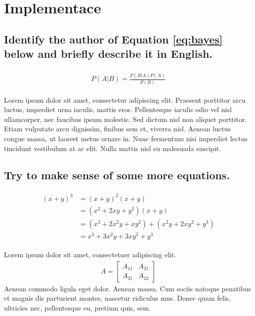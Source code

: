 \documentclass[11pt]{scrartcl} %
\begin{document}
\section{Implementace}

\subsection{Identify the author of Equation \ref{eq:bayes} below and briefly describe it in English.}

\begin{align} 
	\label{eq:bayes}
	\begin{split}
		P(A|B) = \frac{P(B|A)P(A)}{P(B)}
	\end{split}					
\end{align}

Lorem ipsum dolor sit amet, consectetur adipiscing elit. Praesent porttitor arcu luctus, imperdiet urna iaculis, mattis eros. Pellentesque iaculis odio vel nisl ullamcorper, nec faucibus ipsum molestie. Sed dictum nisl non aliquet porttitor. Etiam vulputate arcu dignissim, finibus sem et, viverra nisl. Aenean luctus congue massa, ut laoreet metus ornare in. Nunc fermentum nisi imperdiet lectus tincidunt vestibulum at ac elit. Nulla mattis nisl eu malesuada suscipit.


\subsection{Try to make sense of some more equations.}

\begin{align} 
	\begin{split}
		(x+y)^3 &= (x+y)^2(x+y)\\
		&=(x^2+2xy+y^2)(x+y)\\
		&=(x^3+2x^2y+xy^2) + (x^2y+2xy^2+y^3)\\
		&=x^3+3x^2y+3xy^2+y^3
	\end{split}					
\end{align}

Lorem ipsum dolor sit amet, consectetuer adipiscing elit. 
\begin{align}
	A = 
	\begin{bmatrix}
		A_{11} & A_{21} \\
		A_{21} & A_{22}
	\end{bmatrix}
\end{align}
Aenean commodo ligula eget dolor. Aenean massa. Cum sociis natoque penatibus et magnis dis parturient montes, nascetur ridiculus mus. Donec quam felis, ultricies nec, pellentesque eu, pretium quis, sem.
\end{document}
